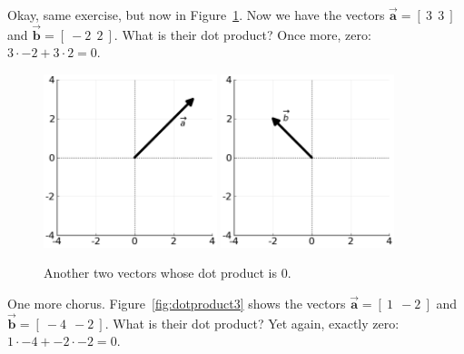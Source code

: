 \bigskip
Okay, same exercise, but now in Figure~\ref{fig:dotproduct2}. Now we have the
vectors $\overrightarrow{\textbf{a}} = [\ 3\ \ 3\ ]$ and
$\overrightarrow{\textbf{b}} = [\ -2\ \ 2\ ]$. What is their dot product? Once
more, zero: $3\cdot -2 + 3\cdot 2 = 0$.

\begin{figure}[ht]
\centering
\includegraphics[width=0.45\textwidth]{dotProduct2a.png}
\includegraphics[width=0.45\textwidth]{dotProduct2b.png}
\caption{Another two vectors whose dot product is 0.}
\label{fig:dotproduct2}
\end{figure}

\bigskip
One more chorus. Figure~\ref{fig:dotproduct3} shows the
vectors $\overrightarrow{\textbf{a}} = [\ 1\ \ -2\ ]$ and
$\overrightarrow{\textbf{b}} = [\ -4\ \ -2\ ]$. What is their dot product? Yet
again, exactly zero: $1\cdot -4 + -2\cdot -2 = 0$.

